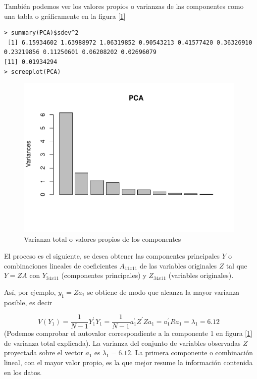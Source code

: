 \documentclass[12pt,twoside]{report}
\begin{document}
También podemos ver los valores propios o varianzas de las componentes como una tabla o gráficamente en la figura [\ref{fig:varianza_total}]

\begin{lstlisting}
> summary(PCA)$sdev^2
 [1] 6.15934602 1.63988972 1.06319852 0.90543213 0.41577420 0.36326910 0.23219856 0.11250601 0.06208202 0.02696079
[11] 0.01934294
> screeplot(PCA)
\end{lstlisting}

\begin{figure}[H]
\includegraphics[width=\textwidth]{../code/figures/varianza_total.pdf}
\caption{Varianza total o valores propios de los componentes}
\label{fig:varianza_total}
\end{figure} 


El proceso es el siguiente, se desea obtener las componentes principales $Y$ o combinaciones lineales de coeficientes $A_{11x11}$ de las variables originales $Z$ tal que $Y = ZA$ con $Y_{34x11}$ (componentes principales) y $Z_{34x11}$ (variables originales).

Así, por ejemplo, $y_1 = Za_1$ se obtiene de modo que alcanza la mayor varianza posible, es decir

$$ V(Y_1) = \frac{1}{N-1}Y^{'}_1Y_1 =  \frac{1}{N-1}a^{'}_{1}Z^{'}Za_{1} = a^{'}_1Ra_1 = \lambda_1 = 6.12 $$
(Podemos comprobar el autovalor correspondiente a la componente 1 en figura [\ref{fig:varianza_total}] de varianza total explicada). La varianza del conjunto de variables observadas $Z$ proyectada sobre el vector $a_1$ es $\lambda_1 = 6.12 $. La primera componente o combinación lineal, con el mayor valor propio, es la que mejor resume la información contenida en los datos. 
\end{document}
